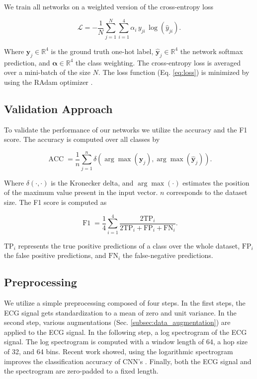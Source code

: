 We train all networks on a weighted version of the cross-entropy loss \cite{Goodfellow2016}

\begin{equation} \label{eq:loss}
    \mathcal{L} = -\frac{1}{N}\sum_{j=1}^{N}\sum_{i=1}^{4}\alpha_{i}\,y_{ji}\,\log(\hat{y}_{ji}).
\end{equation}

Where $\mathbf{y}_{j}\in\mathbb{R}^4$ is the ground truth one-hot label, $\hat{\mathbf{y}}_{j}\in\mathbb{R}^4$ the network softmax prediction, and $\mathbf{\alpha}\in\mathbb{R}^4$ the class weighting. The cross-entropy loss is averaged over a mini-batch of the size $N$. The loss function (Eq. \ref{eq:loss}) is minimized by using the RAdam optimizer \cite{Liu2020}.

\subsection{Validation Approach} \label{subsec:validation}

To validate the performance of our networks we utilize the accuracy and the F1 score. The accuracy is computed over all classes by

\begin{equation}\label{eq:acc}
    \operatorname{ACC}=\frac{1}{n}\sum_{j=1}^{n}\delta\left(\arg\max(\mathbf{y}_{j}), \arg\max(\hat{\mathbf{y}}_{j})\right).
\end{equation}

Where $\delta(\cdot, \cdot)$ is the Kronecker delta, and $\arg\max(\cdot)$ estimates the position of the maximum value present in the input vector. $n$ corresponds to the dataset size. The F1 score is computed as

\begin{equation}\label{eq:f1}
    \operatorname{F1}=\frac{1}{4}\sum_{i=1}^{4}\frac{2\text{TP}_{i}}{2\text{TP}_{i} + \text{FP}_{i} + \text{FN}_{i}}.
\end{equation}

$\text{TP}_{i}$ represents the true positive predictions of a class over the whole dataset, $\text{FP}_{i}$ the false positive predictions, and $\text{FN}_{i}$ the false-negative predictions.

\subsection{Preprocessing} \label{subsec:preprocessing}

We utilize a simple preprocessing composed of four steps. In the first steps, the ECG signal gets standardization to a mean of zero and unit variance. In the second step, various augmentations (Sec. \ref{subsec:data_augmentation}) are applied to the ECG signal. In the following step, a log spectrogram of the ECG signal. The log spectrogram is computed with a window length of 64, a hop size of 32, and 64 bins. Recent work showed, using the logarithmic spectrogram improves the classification accuracy of CNN's \cite{Zihlmann2017}. Finally, both the ECG signal and the spectrogram are zero-padded to a fixed length.

